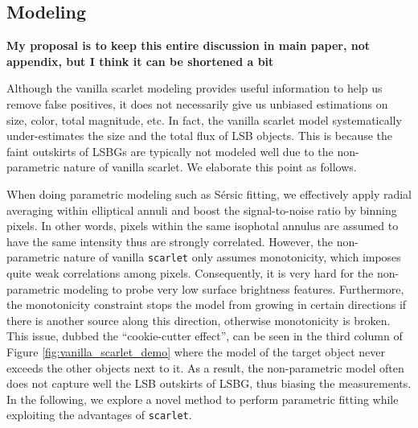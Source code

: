 \documentclass[twocolumn,astrosymb,twocolappendix]{aastex631}
\newcommand{\code}[1]{\texttt{#1}}
\newcommand{\sersic}{S\'ersic}
\begin{document}
\begin{CJK*}{UTF8}{gbsn}

\subsection{Modeling}\label{sec:modeling}

{\bf My proposal is to keep this entire discussion in main paper, not appendix, but I think it can be shortened a bit}


Although the vanilla scarlet modeling provides useful information to help us remove false positives, it does not necessarily give us unbiased estimations on size, color, total magnitude, etc. In fact, the vanilla scarlet model systematically under-estimates the size and the total flux of LSB objects. This is because the faint outskirts of LSBGs are typically not modeled well due to the non-parametric nature of vanilla scarlet. We elaborate this point as follows.

When doing parametric modeling such as \sersic{} fitting, we effectively apply radial averaging within elliptical annuli and boost the signal-to-noise ratio by binning pixels. In other words, pixels within the same isophotal annulus are assumed to have the same intensity thus are strongly correlated. However, the non-parametric nature of vanilla \code{scarlet} only assumes monotonicity, which imposes quite weak correlations among pixels. Consequently, it is very hard for the non-parametric modeling to probe very low surface brightness features. Furthermore, the monotonicity constraint stops the model from growing in certain directions if there is another source along this direction, otherwise monotonicity is broken. This issue, dubbed the ``cookie-cutter effect'', can be seen in the third column of Figure \ref{fig:vanilla_scarlet_demo} where the model of the target object never exceeds the other objects next to it. As a result, the non-parametric model often does not capture well the LSB outskirts of LSBG, thus biasing the measurements. In the following, we explore a novel method to perform parametric fitting while exploiting the advantages of \code{scarlet}.


\end{CJK*}
\end{document}
